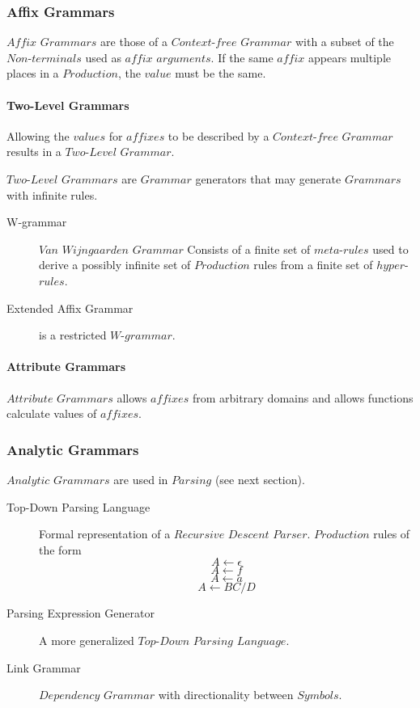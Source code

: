 \documentclass{article}
\begin{document}
\subsubsection{Affix Grammars}

$Affix$ $Grammars$ are those of a $Context$-$free$ $Grammar$ with a
subset of the $Non$-$terminals$ used as $affix$ $arguments$. If the
same $affix$ appears multiple places in a $Production$, the $value$
must be the same.

\paragraph{Two-Level Grammars}
Allowing the $values$ for $affixes$ to be described by a
$Context$-$free$ $Grammar$ results in a $Two$-$Level$ $Grammar$.

$Two$-$Level$ $Grammars$ are $Grammar$ generators that may generate
$Grammars$ with infinite rules.

\begin{description}
\item[W-grammar] $Van$ $Wijngaarden$ $Grammar$ Consists of a finite
  set of $meta$-$rules$ used to derive a possibly infinite set of
  $Production$ rules from a finite set of $hyper$-$rules$.
\item[Extended Affix Grammar] is a restricted $W$-$grammar$.
\end{description}

\paragraph{Attribute Grammars}
$Attribute$ $Grammars$ allows $affixes$ from arbitrary domains and
allows functions calculate values of $affixes$.

\subsubsection{Analytic Grammars}

$Analytic$ $Grammars$ are used in $Parsing$ (see next section).

\begin{description}
\item[Top-Down Parsing Language] Formal representation of a
  $Recursive$ $Descent$ $Parser$. $Production$ rules of the form
\[
    A \leftarrow \epsilon
\]\[
    A \leftarrow f
\]\[
    A \leftarrow a
\]\[
    A \leftarrow BC/D
\]
\item[Parsing Expression Generator]
A more generalized $Top$-$Down$ $Parsing$ $Language$.
\item[Link Grammar]
$Dependency$ $Grammar$ with directionality between $Symbols$.
\end{description}
\end{document}
